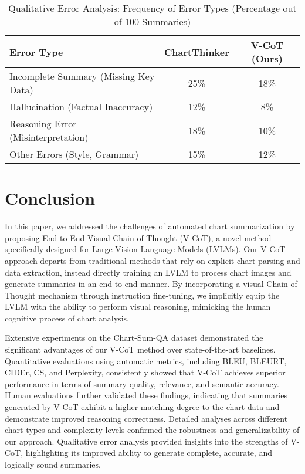 \begin{table}[!t]\small
    \centering
    \caption{Qualitative Error Analysis: Frequency of Error Types (Percentage out of 100 Summaries)}
    \begin{tabular}{lcc}
        \toprule
        Error Type & ChartThinker & V-CoT (Ours) \\
        \midrule
        Incomplete Summary (Missing Key Data) & 25\% & 18\% \\
        Hallucination (Factual Inaccuracy) & 12\% & 8\% \\
        Reasoning Error (Misinterpretation) & 18\% & 10\% \\
        Other Errors (Style, Grammar) & 15\% & 12\% \\
        \bottomrule
    \end{tabular}
    \label{tab:error_analysis}
\end{table}

\section{Conclusion}

In this paper, we addressed the challenges of automated chart summarization by proposing End-to-End Visual Chain-of-Thought (V-CoT), a novel method specifically designed for Large Vision-Language Models (LVLMs).  Our V-CoT approach departs from traditional methods that rely on explicit chart parsing and data extraction, instead directly training an LVLM to process chart images and generate summaries in an end-to-end manner.  By incorporating a visual Chain-of-Thought mechanism through instruction fine-tuning, we implicitly equip the LVLM with the ability to perform visual reasoning, mimicking the human cognitive process of chart analysis.

Extensive experiments on the Chart-Sum-QA dataset demonstrated the significant advantages of our V-CoT method over state-of-the-art baselines.  Quantitative evaluations using automatic metrics, including BLEU, BLEURT, CIDEr, CS, and Perplexity, consistently showed that V-CoT achieves superior performance in terms of summary quality, relevance, and semantic accuracy.  Human evaluations further validated these findings, indicating that summaries generated by V-CoT exhibit a higher matching degree to the chart data and demonstrate improved reasoning correctness.  Detailed analyses across different chart types and complexity levels confirmed the robustness and generalizability of our approach.  Qualitative error analysis provided insights into the strengths of V-CoT, highlighting its improved ability to generate complete, accurate, and logically sound summaries.

